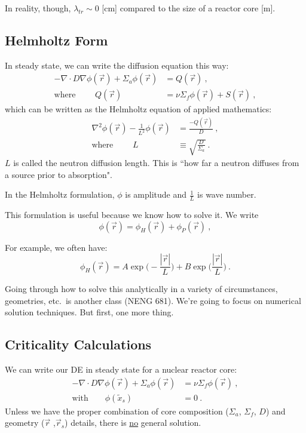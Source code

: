 \documentclass[12pt]{article}
\begin{document}
In reality, though, $\lambda_{tr} \sim 0$ [cm] compared to the size of a reactor core [m]. 


\subsection*{Helmholtz Form}
In steady state, we can write the diffusion equation this way:
%
\begin{align*}
-\nabla \cdot D\nabla \phi(\vec{r}) + 
\Sigma_a \phi(\vec{r}) &= Q(\vec{r})\:, \\
%
\text{where }\qquad Q(\vec{r}) &=
\nu \Sigma_f \phi(\vec{r}) +
S(\vec{r})\:,
\end{align*}
%
which can be written as the Helmholtz equation of applied mathematics:
%
\begin{align*}
\nabla^2 \phi(\vec{r}) - \frac{1}{L^2}\phi(\vec{r}) &= \frac{-Q(\vec{r})}{D}\:, \\
\text{where }\qquad L &\equiv \sqrt{\frac{D}{\Sigma_a}}\:.
\end{align*}
%
$L$ is called the neutron diffusion length. This is ``how far a neutron diffuses from a source prior to absorption". 

In the Helmholtz formulation, $\phi$ is amplitude and $\frac{1}{L}$ is wave number. 

This formulation is useful because we know how to solve it. We write
\[\phi(\vec{r}) = \phi_H(\vec{r}) + \phi_P(\vec{r}) \:,\]

For example, we often have:
\[\phi_H(\vec{r}) = A\exp\bigl(-\frac{|\vec{r}|}{L}\bigr) + B\exp\bigl(\frac{|\vec{r}|}{L}\bigr) \:.\]

Going through how to solve this analytically in a variety of circumstances, geometries, etc.\ is another class (NENG 681). We're going to focus on numerical solution techniques. But first, one more thing.

\subsection*{Criticality Calculations}

We can write our DE in steady state for a nuclear reactor core:
%
\begin{align*}
-\nabla \cdot D\nabla \phi(\vec{r}) + 
\Sigma_a \phi(\vec{r}) &= \nu \Sigma_f \phi(\vec{r})\:, \\
\text{with} \qquad \phi(\tilde{x}_s) &= 0\:.
\end{align*}
%
Unless we have the proper combination of core composition ($\Sigma_a$, $\Sigma_f$, $D$) and geometry ($\vec{r}$ ,$\vec{r}_s$) details, there is \underline{no} general solution. 
\end{document}
